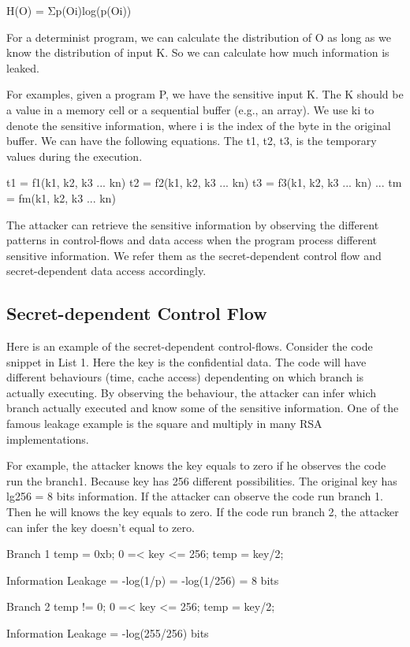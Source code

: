 H(O) = Σp(Oi)log(p(Oi))

For a determinist program, we can calculate the distribution of O as long as we know the distribution of input K. So we can calculate how much information is leaked.

For examples, given a program P, we have the sensitive input K. The K should be a value in a memory cell or a sequential buffer (e.g., an array). We use ki to denote the sensitive information, where i is the index of the byte in the original buffer.  We can have the following equations. The t1, t2, t3, is the temporary values during the execution.

t1 = f1(k1, k2, k3 ... kn)
t2 = f2(k1, k2, k3 ... kn)
t3 = f3(k1, k2, k3 ... kn)
...
tm = fm(k1, k2, k3 ... kn)

The attacker can retrieve the sensitive information by observing the different patterns in control-flows and data access when the program process different sensitive information. We refer them as the secret-dependent control flow and secret-dependent data access accordingly.

\subsection{Secret-dependent Control Flow}
Here is an example of the secret-dependent control-flows. Consider the code snippet in List 1. Here the key is the confidential data. The code will have different behaviours (time, cache access) dependenting on which branch is actually executing. By observing the behaviour, the attacker can infer which branch actually executed and know some of the sensitive information. One of the famous leakage example is the square and multiply in many RSA implementations. 

For example, the attacker knows the key equals to zero if he observes the code run the branch1. Because key has 256 different possibilities. The original key has lg256 = 8 bits information. If the attacker can observe the code run branch 1. Then he will knows the key equals to zero. If the code run branch 2, the attacker can infer the key doesn’t equal to zero. 

Branch 1
temp = 0xb;
0 =< key <= 256;
temp = key/2;

Information Leakage = -log(1/p) = -log(1/256) = 8 bits

Branch 2
temp != 0; 
0 =< key <= 256;
temp = key/2;

Information Leakage = -log(255/256) bits

